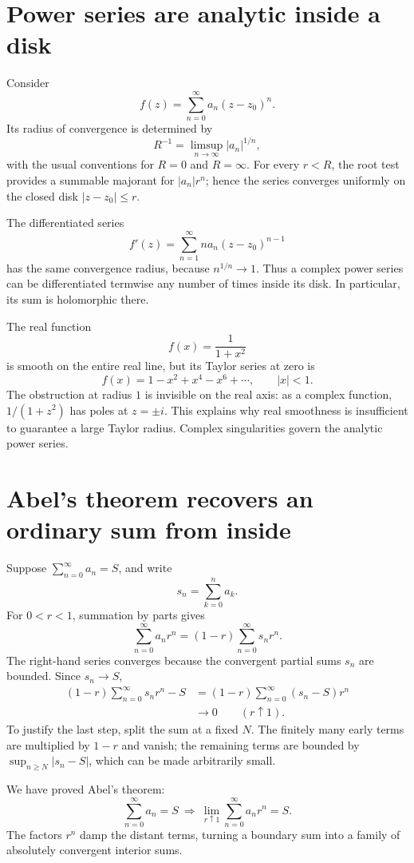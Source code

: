 \section{Power series are analytic inside a disk}

Consider
\[
 f(z)=\sum_{n=0}^{\infty}a_n(z-z_0)^n.
\]
Its radius of convergence is determined by
\[
 R^{-1}=\limsup_{n\to\infty}|a_n|^{1/n},
\]
with the usual conventions for \(R=0\) and \(R=\infty\). For every \(r<R\), the root test provides a summable majorant for \(|a_n|r^n\); hence the series converges uniformly on the closed disk \(|z-z_0|\le r\).

The differentiated series
\[
 f'(z)=\sum_{n=1}^{\infty}n a_n(z-z_0)^{n-1}
\]
has the same convergence radius, because \(n^{1/n}\to1\). Thus a complex power series can be differentiated termwise any number of times inside its disk. In particular, its sum is holomorphic there.

The real function
\[
 f(x)=\frac1{1+x^2}
\]
is smooth on the entire real line, but its Taylor series at zero is
\[
 f(x)=1-x^2+x^4-x^6+\cdots,\qquad |x|<1.
\]
The obstruction at radius \(1\) is invisible on the real axis: as a complex function, \(1/(1+z^2)\) has poles at \(z=\pm i\). This explains why real smoothness is insufficient to guarantee a large Taylor radius. Complex singularities govern the analytic power series.

\section{Abel's theorem recovers an ordinary sum from inside}

Suppose \(\sum_{n=0}^{\infty}a_n=S\), and write
\[
 s_n=\sum_{k=0}^na_k.
\]
For \(0<r<1\), summation by parts gives
\[
 \sum_{n=0}^{\infty}a_nr^n
 =(1-r)\sum_{n=0}^{\infty}s_nr^n.
\]
The right-hand series converges because the convergent partial sums \(s_n\) are bounded. Since \(s_n\to S\),
\[
\begin{aligned}
 (1-r)\sum_{n=0}^{\infty}s_nr^n-S
 &=(1-r)\sum_{n=0}^{\infty}(s_n-S)r^n\\
 &\longrightarrow0\qquad(r\uparrow1).
\end{aligned}
\]
To justify the last step, split the sum at a fixed \(N\). The finitely many early terms are multiplied by \(1-r\) and vanish; the remaining terms are bounded by \(\sup_{n\ge N}|s_n-S|\), which can be made arbitrarily small.

We have proved Abel's theorem:
\[
 \boxed{\sum_{n=0}^{\infty}a_n=S
 \ \Longrightarrow\
 \lim_{r\uparrow1}\sum_{n=0}^{\infty}a_nr^n=S.}
\]
The factors \(r^n\) damp the distant terms, turning a boundary sum into a family of absolutely convergent interior sums.

